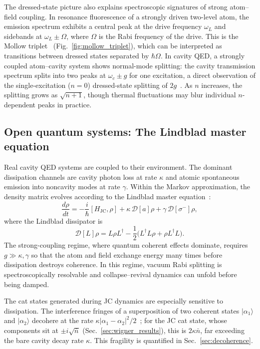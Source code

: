 \documentclass[%
 reprint,
 amsmath,amssymb,
 aps,
 floatfix,
]{revtex4-2}
\newcommand{\revtexonly}[1]{#1}
\begin{document}
The dressed-state picture also explains spectroscopic signatures of strong atom--field coupling. In resonance fluorescence of a strongly driven two-level atom, the emission spectrum exhibits a central peak at the drive frequency $\omega_L$ and sidebands at $\omega_L \pm \Omega$, where $\Omega$ is the Rabi frequency of the drive. This is the Mollow triplet~\cite{mollow1969}\revtexonly{ (Fig.~\ref{fig:mollow_triplet})}, which can be interpreted as transitions between dressed states separated by $\hbar\Omega$. In cavity QED, a strongly coupled atom--cavity system shows normal-mode splitting: the cavity transmission spectrum splits into two peaks at $\omega_c \pm g$ for one excitation, a direct observation of the single-excitation ($n = 0$) dressed-state splitting of $2g$~\cite{thompson1992}. As $n$ increases, the splitting grows as $\sqrt{n+1}$, though thermal fluctuations may blur individual $n$-dependent peaks in practice.


\subsection{Open quantum systems: The Lindblad master equation}
\label{sec:lindblad}

Real cavity QED systems are coupled to their environment. The dominant dissipation channels are cavity photon loss at rate $\kappa$ and atomic spontaneous emission into noncavity modes at rate $\gamma$. Within the Markov approximation, the density matrix evolves according to the Lindblad master equation~\cite{lindblad1976, wiseman2009}:
\begin{equation}
\frac{d\rho}{dt} = -\frac{i}{\hbar}[H_{\text{JC}}, \rho] + \kappa\, \mathcal{D}[a]\rho + \gamma\, \mathcal{D}[\sigma^-]\rho,
\label{eq:lindblad}
\end{equation}
where the Lindblad dissipator is
\begin{equation}
\mathcal{D}[L]\rho = L\rho L^\dagger - \frac{1}{2}\big(L^\dagger L \rho + \rho L^\dagger L\big).
\label{eq:dissipator}
\end{equation}
The strong-coupling regime, where quantum coherent effects dominate, requires $g \gg \kappa, \gamma$ so that the atom and field exchange energy many times before dissipation destroys coherence. In this regime, vacuum Rabi splitting is spectroscopically resolvable and collapse--revival dynamics can unfold before being damped.

The cat states generated during JC dynamics are especially sensitive to dissipation. The interference fringes of a superposition of two coherent states $|\alpha_1\rangle$ and $|\alpha_2\rangle$ decohere at the rate $\kappa|\alpha_1 - \alpha_2|^2/2$~\cite{zurek2003, haroche2006}; for the JC cat state, whose components sit at $\pm i\sqrt{\bar{n}}$ (Sec.~\ref{sec:wigner_results}), this is $2\kappa\bar{n}$, far exceeding the bare cavity decay rate $\kappa$. This fragility is quantified in Sec.~\ref{sec:decoherence}.
\end{document}

